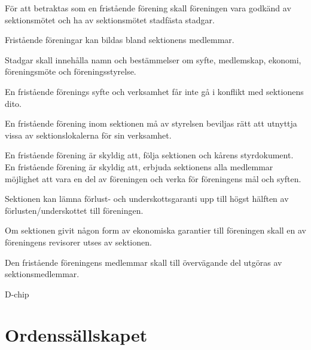 \documentclass[stadgar]{dsekprotokoll}
\begin{document}
\begin{stadgeavsnitt}


För att betraktas som en fristående förening skall föreningen vara godkänd
av sektionsmötet och ha av sektionsmötet stadfästa stadgar.


Fristående föreningar kan bildas bland sektionens medlemmar.


Stadgar skall innehålla namn och bestämmelser om syfte, medlemskap,
ekonomi, föreningsmöte och föreningsstyrelse.


En fristående förenings syfte och verksamhet får inte gå i konflikt med
sektionens dito.


En fristående förening inom sektionen må av styrelsen beviljas rätt att
utnyttja vissa av sektionslokalerna för sin verksamhet.


En fristående förening är skyldig att, följa sektionen och kårens styrdokument. En fristående förening är skyldig att, erbjuda sektionens alla medlemmar möjlighet att vara en del av föreningen och verka för föreningens mål och syften.


Sektionen kan lämna förlust- och underskottsgaranti upp till högst hälften
av förlusten/underskottet till föreningen.


Om sektionen givit någon form av ekonomiska garantier till föreningen skall
en av föreningens revisorer utses av sektionen.


Den fristående föreningens medlemmar skall till övervägande del utgöras av
sektionsmedlemmar.

D-chip \\

\end{stadgeavsnitt}

\section{Ordenssällskapet}
\end{document}
